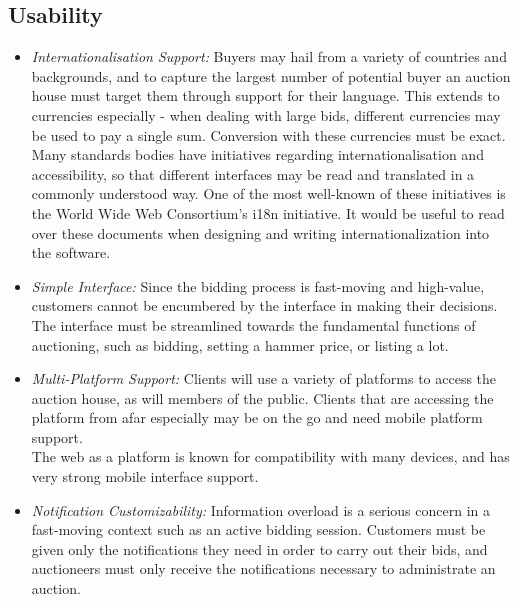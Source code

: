 \documentclass[titlepage, 12pt]{extarticle}
\begin{document}
\subsection{Usability}
\begin{itemize}
\item {\it Internationalisation Support:} Buyers may hail from a variety of countries and backgrounds, and to capture the largest number of potential buyer an auction house must target them through support for their language. This extends to currencies especially - when dealing with large bids, different currencies may be used to pay a single sum. Conversion with these currencies must be exact.
\\Many standards bodies have initiatives regarding internationalisation and accessibility, so that different interfaces may be read and translated in a commonly understood way. One of the most well-known of these initiatives is the World Wide Web Consortium's i18n initiative. It would be useful to read over these documents when designing and writing internationalization into the software.
\item {\it Simple Interface:} Since the bidding process is fast-moving and high-value, customers cannot be encumbered by the interface in making their decisions. The interface must be streamlined towards the fundamental functions of auctioning, such as bidding, setting a hammer price, or listing a lot.
\item {\it Multi-Platform Support:} Clients will use a variety of platforms to access the auction house, as will members of the public. Clients that are accessing the platform from afar especially may be on the go and need mobile platform support.
\\The web as a platform is known for compatibility with many devices, and has very strong mobile interface support.
\item {\it Notification Customizability:} Information overload is a serious concern in a fast-moving context such as an active bidding session. Customers must be given only the notifications they need in order to carry out their bids, and auctioneers must only receive the notifications necessary to administrate an auction.
\end{itemize}
\end{document}
